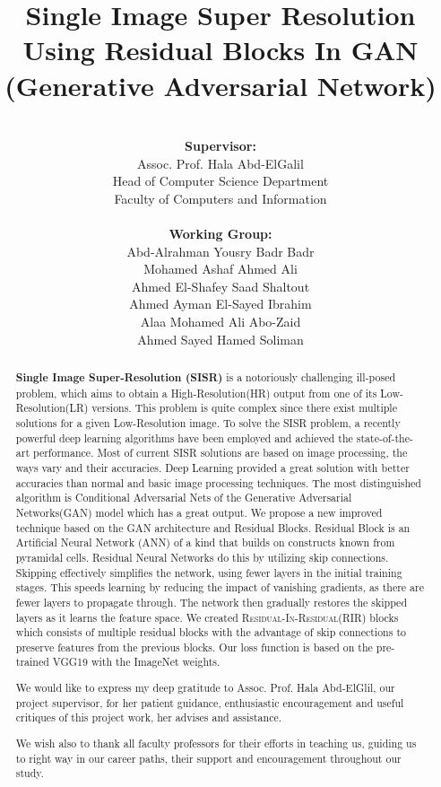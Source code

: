 \documentclass[12pt]{article}
\title{\vspace{1in} Single Image Super Resolution Using Residual Blocks In GAN (Generative Adversarial Network)}
\author{
	\vspace{0.3in}\\
	\textbf{Supervisor:}\\Assoc. Prof. Hala Abd-ElGalil\\Head of Computer Science Department\\Faculty of Computers and Information\\
	\vspace{0.2in}\\
	\textbf{Working Group:}\\Abd-Alrahman Yousry Badr Badr\\Mohamed Ashaf Ahmed Ali\\Ahmed El-Shafey Saad Shaltout\\Ahmed Ayman El-Sayed Ibrahim\\Alaa Mohamed Ali Abo-Zaid\\Ahmed Sayed Hamed Soliman
	\vspace{0.5in}
}
\begin{document}
	\begin{titlepage}
		\maketitle
		\thispagestyle{empty}
	\end{titlepage}
	\begin{abstract}
		\textbf{Single Image Super-Resolution (SISR)} is a notoriously challenging ill-posed problem, which aims to obtain a High-Resolution(HR) output from one of its Low-Resolution(LR) versions. This problem is quite complex since there exist multiple solutions for a given Low-Resolution image. To solve the SISR problem, a recently powerful deep learning algorithms have been employed and achieved the state-of-the-art performance. Most of current SISR solutions are based on image processing, the ways vary and their accuracies. Deep Learning provided a great solution with better accuracies than normal and basic image processing techniques. The most distinguished algorithm is Conditional Adversarial Nets of the Generative Adversarial Networks(GAN) model which has a great output. We propose a new improved technique based on the GAN architecture and Residual Blocks. Residual Block is an Artificial Neural Network (ANN) of a kind that builds on constructs known from pyramidal cells. Residual Neural Networks do this by utilizing skip connections. Skipping effectively simplifies the network, using fewer layers in the initial training stages. This speeds learning by reducing the impact of vanishing gradients, as there are fewer layers to propagate through. The network then gradually restores the skipped layers as it learns the feature space. We created \textsc{Residual-In-Residual(RIR)} blocks which consists of multiple residual blocks with the advantage of skip connections to preserve features from the previous blocks. Our loss function is based on the pre-trained VGG19 with the ImageNet weights.
	\end{abstract}
	\vspace{0.5in}
	\renewcommand{\abstractname}{Acknowledgements}
	\begin{abstract}
		We would like to express my deep gratitude to Assoc. Prof. Hala Abd-ElGlil, our project supervisor, for her patient guidance, enthusiastic encouragement and useful critiques of this project work, her advises and assistance.
		
		We wish also to thank all faculty professors for their efforts in teaching us, guiding us to right way in our career paths, their support and encouragement throughout our study.
	\end{abstract}
	\thispagestyle{empty}
	\clearpage
	
\end{document}
